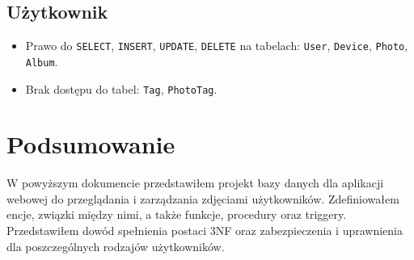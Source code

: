 \documentclass[12pt,a4paper]{article}
\begin{document}
\subsection{Użytkownik}
\begin{itemize}
    \item Prawo do \texttt{SELECT}, \texttt{INSERT}, \texttt{UPDATE}, \texttt{DELETE} na tabelach: \texttt{User}, \texttt{Device}, \texttt{Photo}, \texttt{Album}.
    \item Brak dostępu do tabel: \texttt{Tag}, \texttt{PhotoTag}.
\end{itemize}

\section{Podsumowanie}
W powyższym dokumencie przedstawiłem projekt bazy danych dla aplikacji webowej do przeglądania i zarządzania zdjęciami użytkowników. Zdefiniowałem encje, związki między nimi, a także funkcje, procedury oraz triggery. Przedstawiłem dowód spełnienia postaci 3NF oraz zabezpieczenia i uprawnienia dla poszczególnych rodzajów użytkowników.
\end{document}
